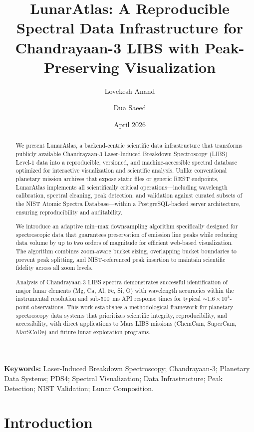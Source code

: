 \documentclass[12pt,a4paper]{article}
\title{LunarAtlas: A Reproducible Spectral Data Infrastructure for Chandrayaan-3 LIBS with Peak-Preserving Visualization}
\author[1]{Lovekesh Anand}
\author[1]{Dua Saeed}
\affil[1]{Independent Researchers}
\date{April 2026}
\begin{document}
\maketitle

\begin{abstract}
We present LunarAtlas, a backend-centric scientific data infrastructure that transforms publicly available Chandrayaan-3 Laser-Induced Breakdown Spectroscopy (LIBS) Level-1 data into a reproducible, versioned, and machine-accessible spectral database optimized for interactive visualization and scientific analysis. Unlike conventional planetary mission archives that expose static files or generic REST endpoints, LunarAtlas implements all scientifically critical operations---including wavelength calibration, spectral cleaning, peak detection, and validation against curated subsets of the NIST Atomic Spectra Database---within a PostgreSQL-backed server architecture, ensuring reproducibility and auditability. 

We introduce an adaptive min--max downsampling algorithm specifically designed for spectroscopic data that guarantees preservation of emission line peaks while reducing data volume by up to two orders of magnitude for efficient web-based visualization. The algorithm combines zoom-aware bucket sizing, overlapping bucket boundaries to prevent peak splitting, and NIST-referenced peak insertion to maintain scientific fidelity across all zoom levels. 

Analysis of Chandrayaan-3 LIBS spectra demonstrates successful identification of major lunar elements (Mg, Ca, Al, Fe, Si, O) with wavelength accuracies within the instrumental resolution and sub-\SI{500}{ms} API response times for typical \(\sim 1.6\times10^{4}\)-point observations. This work establishes a methodological framework for planetary spectroscopy data systems that prioritizes scientific integrity, reproducibility, and accessibility, with direct applications to Mars LIBS missions (ChemCam, SuperCam, MarSCoDe) and future lunar exploration programs.
\end{abstract}

\noindent\textbf{Keywords:} Laser-Induced Breakdown Spectroscopy; Chandrayaan-3; Planetary Data Systems; PDS4; Spectral Visualization; Data Infrastructure; Peak Detection; NIST Validation; Lunar Composition.

\section{Introduction}
\end{document}
